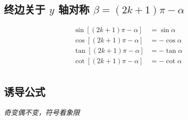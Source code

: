 \documentclass[a4paper, fleqn]{ctexart}
\newcommand{\diform}{\noindent}
\begin{document}
\begin{multicols}{2}
		\subsection{终边关于 $ y $ 轴对称 $\beta=(2k+1)\pi-\alpha$}\diform
			\begin{align*}
			\sin\left[\left(2k+1\right)\pi-\alpha\right]&=\sin\alpha \\
			\cos\left[\left(2k+1\right)\pi-\alpha\right]&=-\cos\alpha \\
			\tan\left[\left(2k+1\right)\pi-\alpha\right]&=-\tan\alpha \\
			\cot\left[\left(2k+1\right)\pi-\alpha\right]&=-\cot\alpha \\
			\end{align*}
		\end{multicols}
		
		\subsection{诱导公式}
		\emph{奇变偶不变，符号看象限}
		
%			
\end{document}
